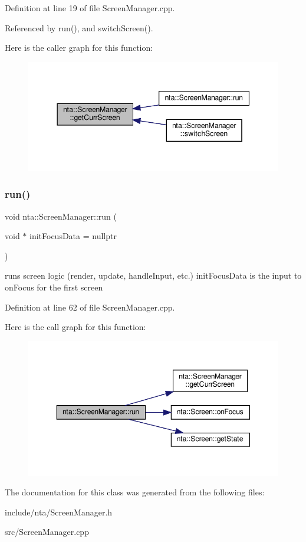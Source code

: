 Definition at line 19 of file Screen\+Manager.\+cpp.



Referenced by run(), and switch\+Screen().

Here is the caller graph for this function\+:\nopagebreak
\begin{figure}[H]
\begin{center}
\leavevmode
\includegraphics[width=344pt]{d0/dc4/classnta_1_1ScreenManager_a4b26e8adc481bfb37a088e047e4ccc2a_icgraph}
\end{center}
\end{figure}
\mbox{\label{classnta_1_1ScreenManager_ad20be92778255ff1527e84bb8e54abe3}} 
\subsubsection{\texorpdfstring{run()}{run()}}
{\footnotesize\ttfamily void nta\+::\+Screen\+Manager\+::run (\begin{DoxyParamCaption}\item[{void $\ast$}]{init\+Focus\+Data = {\ttfamily nullptr} }\end{DoxyParamCaption})}

runs screen logic (render, update, handle\+Input, etc.) init\+Focus\+Data is the input to on\+Focus for the first screen 

Definition at line 62 of file Screen\+Manager.\+cpp.

Here is the call graph for this function\+:
\nopagebreak
\begin{figure}[H]
\begin{center}
\leavevmode
\includegraphics[width=350pt]{d0/dc4/classnta_1_1ScreenManager_ad20be92778255ff1527e84bb8e54abe3_cgraph}
\end{center}
\end{figure}


The documentation for this class was generated from the following files\+:\begin{DoxyCompactItemize}
\item 
include/nta/Screen\+Manager.\+h\item 
src/Screen\+Manager.\+cpp\end{DoxyCompactItemize}
